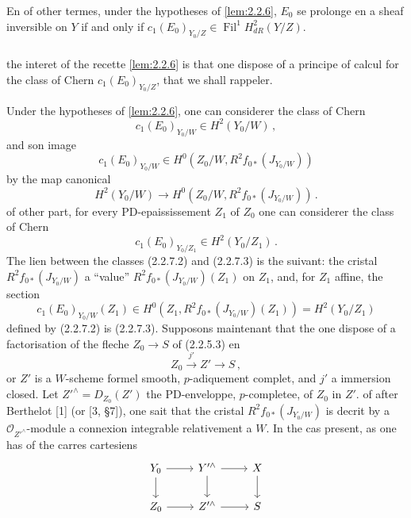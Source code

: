 \documentclass[12pt,a4paper]{article}
\theoremstyle{plain}
\theoremstyle{definition}
\theoremstyle{remark}
\DeclareMathOperator{\Fil}{Fil}
\begin{document}
En of other termes, under the hypotheses of \ref{lem:2.2.6}, $E_0$ se prolonge en a sheaf inversible on $Y$ if and only if $c_1(E_0)_{Y_0/Z} \in \Fil^1H_{dR}^2(Y/Z)$.

\subsubsection{}

the interet of the recette \ref{lem:2.2.6} is that one dispose of a principe of calcul for the class of Chern $c_1(E_0)_{Y_0/Z}$, that we shall rappeler.

Under the hypotheses of \ref{lem:2.2.6}, one can considerer the class of Chern
\begin{equation}\label{eq:2.2.7.1}
c_1(E_0)_{Y_0/W} \in H^2(Y_0/W)\,,\end{equation}
and son image
\begin{equation}\label{eq:2.2.7.2}
c_1(E_0)_{Y_0/W} \in H^0(Z_0/W, R^2f_{0*}(J_{Y_0/W}))
\end{equation}
by the map canonical
\[
H^2(Y_0/W) \longrightarrow H^0(Z_0/W, R^2f_{0*}(J_{Y_0/W}))\,.\]
of other part, for every PD-epaississement $Z_1$ of $Z_0$ one can considerer the class of Chern
\begin{equation}\label{eq:2.2.7.3}
c_1(E_0)_{Y_0/Z_1} \in H^2(Y_0/Z_1)\,.\end{equation}
The lien between the classes (2.2.7.2) and (2.2.7.3) is the suivant: the cristal $R^2f_{0*}(J_{Y_0/W})$ a ``value'' $R^2f_{0*}(J_{Y_0/W})(Z_1)$ on $Z_1$, and, for $Z_1$ affine, the section
\[
c_1(E_0)_{Y_0/W}(Z_1) \in H^0(Z_1, R^2f_{0*}(J_{Y_0/W})(Z_1)) = H^2(Y_0/Z_1)
\]
defined by (2.2.7.2) is (2.2.7.3). Supposons maintenant that the one dispose of a factorisation of the fleche $Z_0 \to S$ of (2.2.5.3) en
\begin{equation}\label{eq:2.2.7.4}
Z_0 \xrightarrow{j'} Z' \longrightarrow S\,,
\end{equation}
or $Z'$ is a $W$-scheme formel smooth, $p$-adiquement complet, and $j'$ a immersion closed. Let $Z'^\wedge = D_{Z_0}(Z')$ the PD-enveloppe, $p$-completee, of $Z_0$ in $Z'$. of after Berthelot [1] (or [3, \S 7]), one sait that the cristal $R^2f_{0*}(J_{Y_0/W})$ is decrit by a $\mathcal{O}_{Z'^\wedge}$-module a connexion integrable relativement a $W$. In the cas present, as one has of the carres cartesiens
\begin{equation}\label{eq:2.2.7.5}
\begin{tikzcd}
Y_0 \rar \dar & Y'^\wedge \rar \dar & X \dar \\
Z_0 \rar & Z'^\wedge \rar & S
\end{tikzcd}
\end{equation}
\end{document}
